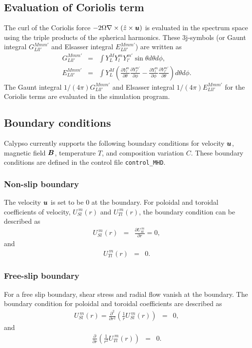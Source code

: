 \subsection{Evaluation of Coriolis term}
The curl of the Coriolis force $-2\Omega \nabla \times \left(\hat{z} \times \mbox{\boldmath$u$} \right)$ is evaluated in the spectrum space using the triple products of the spherical harmonics. These 3j-symbols (or Gaunt integral $G_{Lll'}^{Mmm'}$ and Elsasser integral $E_{Lll'}^{Mmm'}$) are written as
%
\begin{eqnarray}
G_{Lll'}^{Mmm'} & = & \int Y_{L}^{M} Y_{l}^{m} Y_{l'}^{m'}
\sin\theta d\theta d\phi,
\nonumber \\
E_{Lll'}^{Mmm'} & = & \int Y_{L}^{M} \left (
   \frac{\partial Y_{l}^{m}}{\partial \theta} \frac{\partial Y_{l'}^{m'}}{\partial\phi}
 - \frac{\partial Y_{l}^{m}}{\partial \phi} \frac{\partial Y_{l'}^{m'}}{\partial \theta}
 \nonumber
\right) d\theta d\phi.
\nonumber
\end{eqnarray}
%
The Gaunt integral $1/(4\pi) G_{Lll'}^{Mmm'}$ and Elsasser integral $1/(4\pi) E_{Lll'}^{Mmm'}$ for the Coriolis terms are evaluated in the simulation program.


\subsection{Boundary conditions}
Calypso currently supports the following boundary conditions for velocity $\mbox{\boldmath$u$}$, magnetic field $\mbox{\boldmath$B$}$, temperature $T$, and composition variation $C$. These boundary conditions are defined in the control file \verb|control_MHD|.

\subsubsection{Non-slip boundary}
The velocity $\mbox{\boldmath$u$}$ is set to be 0 at the boundary. For poloidal and toroidal coefficients of velocity, $U_{Sl}^{\ m}(r)$ and $U_{Tl}^{\ m}(r)$, the boundary condition can be described as
%
\begin{eqnarray}
U_{Sl}^{\ m}(r) & = & \frac{\partial U_{Sl}^{\ m}}{\partial r} = 0,
\nonumber
\end{eqnarray}
%
and 
%
\begin{eqnarray}
U_{Tl}^{\ m}(r) & = & 0.
\nonumber
\end{eqnarray}
%
\subsubsection{Free-slip boundary}
For a free slip boundary, shear stress and radial flow vanish at the boundary. The boundary condition for poloidal and toroidal coefficients are described as
%
\begin{eqnarray}
U_{Sl}^{\ m}(r) = \frac{\partial^2}{\partial r^2} \left( \frac{1}{r} U_{Sl}^{\ m}(r) \right) & = & 0,
\nonumber
\end{eqnarray}
%
and 
%
\begin{eqnarray}
\frac{\partial}{\partial r} \left( \frac{1}{r^2} U_{Tl}^{\ m}(r) \right) & = & 0.
\nonumber
\end{eqnarray}
%
